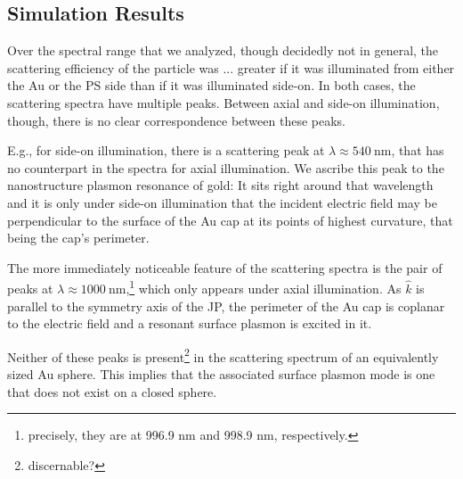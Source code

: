 \documentclass[10pt]{article}
\begin{document}
\begin{multicols}{2}
\section*{Simulation Results}



Over the spectral range that we analyzed, though decidedly not in general, the scattering efficiency of the particle was ... greater if it was illuminated from either the Au or the PS side than if it was illuminated side-on. 
In both cases, the scattering spectra have multiple peaks. 
Between axial and side-on illumination, though, there is no clear correspondence between these peaks. 

E.g., for side-on illumination, there is a scattering peak at $\lambda\approx\SI{540}{\nano\meter}$, that has no counterpart in the spectra for axial illumination. 
We ascribe this peak to the nanostructure plasmon resonance of gold: 
It sits right around that wavelength and it is only under side-on illumination that the incident electric field may be perpendicular to the surface of the Au cap at its points of highest curvature, that being the cap's perimeter. 

The more immediately noticeable feature of the scattering spectra is the pair of peaks at $\lambda\approx\SI{1000}{\nano\meter}$,\footnote{precisely, they are at 996.9 nm and 998.9 nm, respectively.} which only appears under axial illumination. 
As $\hat{k}$ is parallel to the symmetry axis of the JP, the perimeter of the Au cap is coplanar to the electric field and a resonant surface plasmon is excited in it. 

Neither of these peaks is present\footnote{discernable?} in the scattering spectrum of an equivalently sized Au sphere. 
This implies that the associated surface plasmon mode is one that does not exist on a closed sphere.  



\end{multicols}
\end{document}
